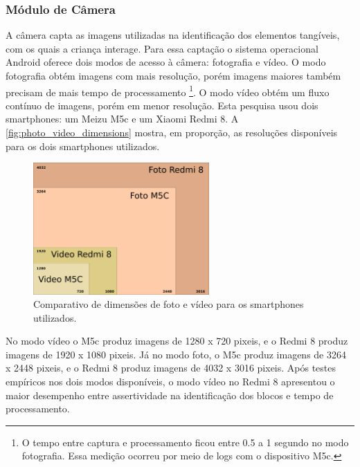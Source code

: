 \subsubsection{Módulo de Câmera}
\label{sec:camera}

A câmera capta as imagens utilizadas na identificação dos elementos tangíveis, com os quais a criança interage. Para essa captação o sistema operacional Android oferece dois modos de acesso à câmera: fotografia e vídeo. O modo fotografia obtém imagens com mais resolução, porém imagens maiores também precisam de mais tempo de processamento \footnote{O tempo entre captura e processamento ficou entre 0.5 a 1 segundo no modo fotografia. Essa medição ocorreu por meio de logs com o dispositivo M5c.}. O modo vídeo obtém um fluxo contínuo de imagens, porém em menor resolução. Esta pesquisa usou dois smartphones: um Meizu M5c e um Xiaomi Redmi 8. A \autoref{fig:photo_video_dimensions} mostra, em proporção, as resoluções disponíveis para os dois smartphones utilizados.

\begin{figure}[!h]
   \centering
   \includegraphics[width=0.6\textwidth,fbox]{figs/photo_video_dimensions.png}
   \caption{Comparativo de dimensões de foto e vídeo para os smartphones utilizados.}
   \label{fig:photo_video_dimensions}
\end{figure}
No modo vídeo o M5c produz imagens de 1280 x 720 pixeis, e o Redmi 8 produz imagens de 1920 x 1080 pixeis. Já no modo foto, o M5c produz imagens de 3264 x 2448 pixeis, e o Redmi 8 produz imagens de 4032 x 3016 pixeis. Após testes empíricos nos dois modos disponíveis, o modo vídeo no Redmi 8 apresentou o maior desempenho entre assertividade na identificação dos blocos e tempo de processamento.

